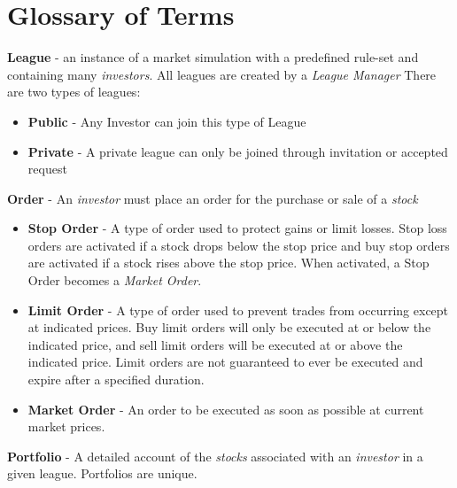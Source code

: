 \section{Glossary of Terms}

{
\raggedright
\textbf{League} - an instance of a market simulation with a predefined rule-set and containing many \emph{investors}. All leagues are created by a \emph{League Manager} There are two types of leagues:
\begin{itemize}
\item \textbf{Public} - Any Investor can join this type of League
\item \textbf{Private} - A private league can only be joined through invitation or accepted request
\end{itemize}
\textbf{Order} - An \emph{investor} must place an order for the purchase or sale of a \emph{stock}
\begin{itemize}
\item \textbf{Stop Order} - A type of order used to protect gains or limit losses. Stop loss
orders are activated if a stock drops below the stop price and buy stop orders
are activated if a stock rises above the stop price. When activated, a Stop Order becomes a
\emph{Market Order}. 
\item \textbf{Limit Order} - A type of order used to prevent trades from occurring except at indicated
prices. Buy limit orders will only be executed at or below the indicated price, and sell limit
orders will be executed at or above the indicated price. Limit orders are not guaranteed to ever
be executed and expire after a specified duration.
\item \textbf{Market Order} - An order to be executed as soon as possible at current market prices.
\end{itemize}
\textbf{Portfolio} - A detailed account of the \emph{stocks} associated with an \emph{investor} 
in a given league. Portfolios are unique. 

}
